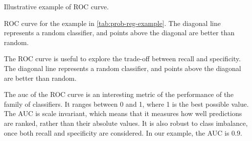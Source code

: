 \begin{figurebox}[label=fig:roc-example]{Illustrative example of ROC curve.}
  \centering
  \tcblower
  ROC curve for the example in \cref{tab:prob-reg-example}.  The diagonal line represents
  a random \gls{classifier}, and points above the diagonal are better than random.
\end{figurebox}

The ROC curve is useful to explore the trade-off between recall and specificity.  The
diagonal line represents a random \gls{classifier}, and points above the diagonal are better
than random.

The \gls{auc} of the ROC curve is an interesting metric of the performance of the
family of \glspl{classifier}.  It ranges between 0 and 1, where 1 is the best possible value.
The AUC is scale invariant, which means that it measures how well
predictions are ranked, rather than their absolute values.  It is also robust to
class imbalance, once both recall and specificity are considered.
In our example, the AUC is $0.9$.


